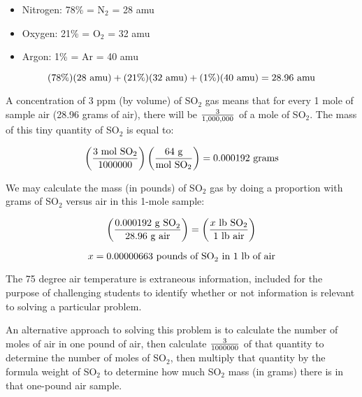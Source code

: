 \begin{itemize}
\item{} Nitrogen: 78\% = N$_{2}$ = 28 amu
\item{} Oxygen: 21\% = O$_{2}$ = 32 amu
\item{} Argon: 1\% = Ar = 40 amu
\end{itemize}

$$(78\%)(28 \hbox{ amu}) + (21\%)(32 \hbox{ amu}) + (1\%)(40 \hbox{ amu}) = 28.96 \hbox{ amu}$$

\vskip 10pt

A concentration of 3 ppm (by volume) of SO$_{2}$ gas means that for every 1 mole of sample air (28.96 grams of air), there will be $3 \over 1,000,000$ of a mole of SO$_{2}$.  The mass of this tiny quantity of SO$_{2}$ is equal to:

$$\left( {3 \hbox{ mol SO}_2 \over 1000000} \right) \left( {64 \hbox{ g} \over \hbox{mol SO}_2} \right) = 0.000192 \hbox{ grams}$$

We may calculate the mass (in pounds) of SO$_{2}$ gas by doing a proportion with grams of SO$_{2}$ versus air in this 1-mole sample:

$$\left( {0.000192 \hbox{ g SO}_2 \over 28.96 \hbox{ g air}} \right) = \left( {x \hbox{ lb SO}_2 \over 1 \hbox{ lb air} } \right)$$

$$x = 0.00000663 \hbox{ pounds of SO}_2 \hbox{ in 1 lb of air}$$

\vskip 10pt

The 75 degree air temperature is extraneous information, included for the purpose of challenging students to identify whether or not information is relevant to solving a particular problem.

\vskip 10pt

\filbreak

An alternative approach to solving this problem is to calculate the number of moles of air in one pound of air, then calculate $3 \over 1000000$ of that quantity to determine the number of moles of SO$_{2}$, then multiply that quantity by the formula weight of SO$_{2}$ to determine how much SO$_{2}$ mass (in grams) there is in that one-pound air sample.





